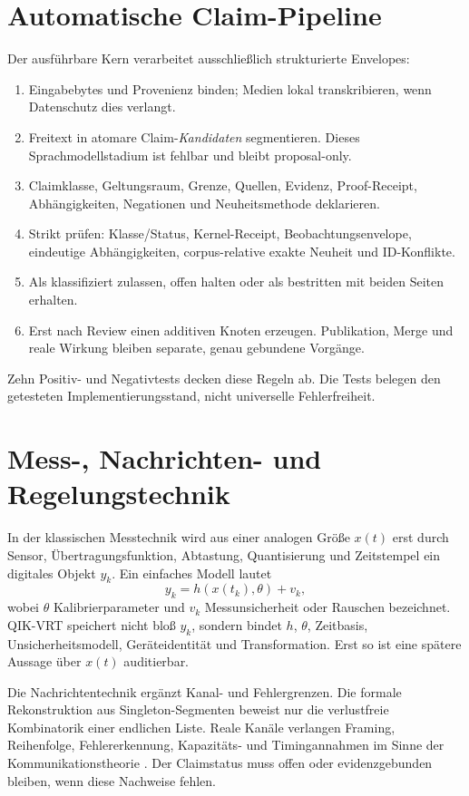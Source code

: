 \documentclass[11pt,a4paper,oneside]{article}
\begin{document}
\section{Automatische Claim-Pipeline}

Der ausführbare Kern verarbeitet ausschließlich strukturierte Envelopes:

\begin{enumerate}
  \item Eingabebytes und Provenienz binden; Medien lokal transkribieren, wenn
  Datenschutz dies verlangt.
  \item Freitext in atomare Claim-\emph{Kandidaten} segmentieren. Dieses
  Sprachmodellstadium ist fehlbar und bleibt proposal-only.
  \item Claimklasse, Geltungsraum, Grenze, Quellen, Evidenz, Proof-Receipt,
  Abhängigkeiten, Negationen und Neuheitsmethode deklarieren.
  \item Strikt prüfen: Klasse/Status, Kernel-Receipt, Beobachtungsenvelope,
  eindeutige Abhängigkeiten, corpus-relative exakte Neuheit und ID-Konflikte.
  \item Als klassifiziert zulassen, offen halten oder als bestritten mit beiden
  Seiten erhalten.
  \item Erst nach Review einen additiven Knoten erzeugen. Publikation, Merge
  und reale Wirkung bleiben separate, genau gebundene Vorgänge.
\end{enumerate}

Zehn Positiv- und Negativtests decken diese Regeln ab. Die Tests belegen den
getesteten Implementierungsstand, nicht universelle Fehlerfreiheit.

\section{Mess-, Nachrichten- und Regelungstechnik}

In der klassischen Messtechnik wird aus einer analogen Größe $x(t)$ erst durch
Sensor, Übertragungsfunktion, Abtastung, Quantisierung und Zeitstempel ein
digitales Objekt $y_k$. Ein einfaches Modell lautet
\[
 y_k = h(x(t_k),\theta) + v_k,
\]
wobei $\theta$ Kalibrierparameter und $v_k$ Messunsicherheit oder Rauschen
bezeichnet. QIK-VRT speichert nicht bloß $y_k$, sondern bindet $h$, $\theta$,
Zeitbasis, Unsicherheitsmodell, Geräteidentität und Transformation. Erst so ist
eine spätere Aussage über $x(t)$ auditierbar.

Die Nachrichtentechnik ergänzt Kanal- und Fehlergrenzen. Die formale
Rekonstruktion aus Singleton-Segmenten beweist nur die verlustfreie Kombinatorik einer
endlichen Liste. Reale Kanäle verlangen Framing, Reihenfolge, Fehlererkennung,
Kapazitäts- und Timingannahmen im Sinne der Kommunikationstheorie
\cite{Shannon1948}. Der Claimstatus muss offen oder evidenzgebunden bleiben,
wenn diese Nachweise fehlen.
\end{document}
